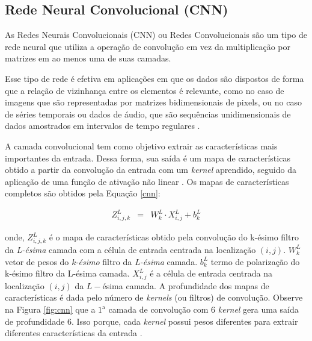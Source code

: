 \subsection{Rede Neural Convolucional (CNN)}

As Redes Neurais Convolucionais (CNN) ou Redes Convolucionais são um tipo de rede neural que utiliza a operação de convolução em vez da multiplicação por matrizes em ao menos uma de suas camadas.

Esse tipo de rede é efetiva em aplicações \cite{7533055} em que os dados são dispostos de forma que a relação de vizinhança entre os elementos é relevante, como no caso de imagens que são representadas por matrizes bidimensionais de pixels, ou no caso de séries temporais ou dados de áudio, que são sequências unidimensionais de dados amostrados em intervalos de tempo regulares \cite{silva_2021}.


A camada convolucional tem como objetivo extrair as características mais importantes da entrada. Dessa forma, sua saída é um mapa de características obtido a partir da convolução da entrada com um \textit{kernel} aprendido, seguido da aplicação de uma função de ativação não linear \cite{lucas_2019}. Os mapas de características completos são obtidos pela Equação \eqref{cnn}:

\begin{eqnarray}
	Z_{i, j, k}^L&=&W_k^L \cdot X_{i, j}^L+b_k^L\label{cnn}
\end{eqnarray}

\noindent onde,
$Z_{i, j, k}^L$ é o mapa de características obtido pela convolução do k-ésimo filtro da \textit{L-ésima} camada com a célula de entrada centrada na localização $(i, j)$.
$W_k^L$ vetor de pesos do \textit{k-ésimo} filtro da \textit{L-ésima} camada.
$b_k^L$ termo de polarização do k-ésimo filtro da L-ésima camada.
$X_{i, j}^L$ é a célula de entrada centrada na localização $(i,j)$ da $L-$ésima camada.
A profundidade dos mapas de características é dada pelo número de \textit{kernels} (ou
filtros) de convolução. Observe na Figura \ref{fig:cnn} que a $1^{\mathrm{a}}$
camada de convolução com 6 \textit{kernel} gera uma saída de profundidade 6. Isso porque, cada \textit{kernel} possui pesos diferentes para extrair diferentes características da entrada \cite{lucas_2019}.

